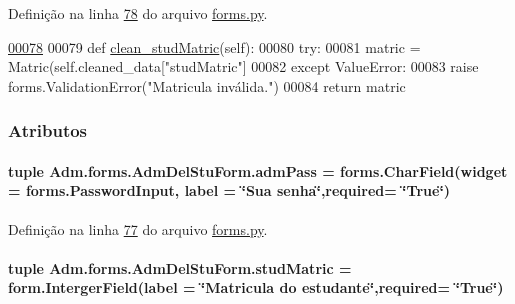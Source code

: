 Definição na linha \hyperlink{Adm_2forms_8py_source_l00078}{78} do arquivo \hyperlink{Adm_2forms_8py_source}{forms.\-py}.


\begin{DoxyCode}
\hypertarget{classAdm_1_1forms_1_1AdmDelStuForm_l00078}{}\hyperlink{classAdm_1_1forms_1_1AdmDelStuForm_ad50237848b6ed6ec4d8f8b943549fa37}{00078} 
00079     \textcolor{keyword}{def }\hyperlink{classAdm_1_1forms_1_1AdmDelStuForm_ad50237848b6ed6ec4d8f8b943549fa37}{clean\_studMatric}(self):
00080         \textcolor{keywordflow}{try}:
00081             matric = Matric(self.cleaned\_data[\textcolor{stringliteral}{"studMatric"}]
00082         \textcolor{keywordflow}{except} ValueError:
00083             \textcolor{keywordflow}{raise} forms.ValidationError(\textcolor{stringliteral}{"Matricula inválida."})
00084         \textcolor{keywordflow}{return} matric
    
\end{DoxyCode}


\subsubsection{Atributos}
\hypertarget{classAdm_1_1forms_1_1AdmDelStuForm_aff2b1076da947f2f4415f985bdc46d18}{
\paragraph[{adm\-Pass}]{\setlength{\rightskip}{0pt plus 5cm}tuple Adm.\-forms.\-Adm\-Del\-Stu\-Form.\-adm\-Pass = forms.\-Char\-Field(widget = forms.\-Password\-Input, label = \char`\"{}Sua senha\char`\"{},required= \char`\"{}True\char`\"{})\hspace{0.3cm}{\ttfamily [static]}}}\label{classAdm_1_1forms_1_1AdmDelStuForm_aff2b1076da947f2f4415f985bdc46d18}


Definição na linha \hyperlink{Adm_2forms_8py_source_l00077}{77} do arquivo \hyperlink{Adm_2forms_8py_source}{forms.\-py}.

\hypertarget{classAdm_1_1forms_1_1AdmDelStuForm_a9ab40744579cf679da8a3a922a29061c}{
\paragraph[{stud\-Matric}]{\setlength{\rightskip}{0pt plus 5cm}tuple Adm.\-forms.\-Adm\-Del\-Stu\-Form.\-stud\-Matric = form.\-Interger\-Field(label = \char`\"{}Matricula do estudante\char`\"{},required= \char`\"{}True\char`\"{})\hspace{0.3cm}{\ttfamily [static]}}}\label{classAdm_1_1forms_1_1AdmDelStuForm_a9ab40744579cf679da8a3a922a29061c}


